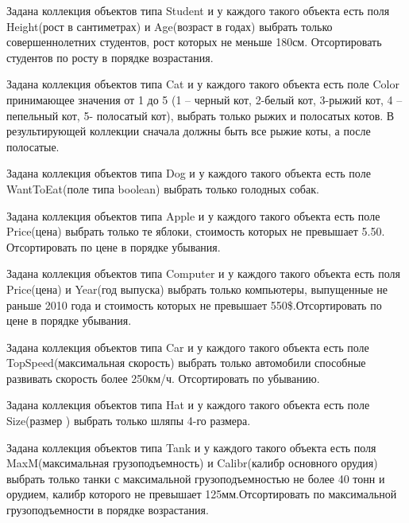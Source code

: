 \task Задана коллекция объектов типа Student и у каждого такого объекта
есть поля Height(рост в сантиметрах) и Age(возраст в годах) выбрать
только совершеннолетних студентов, рост которых не меньше
180см. Отсортировать студентов по росту в порядке возрастания.

\task Задана коллекция объектов типа Cat и у каждого такого объекта есть
поле Color принимающее значения от 1 до 5 (1 – черный кот, 2-белый
кот, 3-рыжий кот, 4 – пепельный кот, 5- полосатый кот), выбрать только
рыжих и полосатых котов. В результирующей коллекции сначала должны
быть все рыжие коты, а после полосатые.

\task Задана коллекция объектов типа Dog и у каждого такого объекта есть
поле WantToEat(поле типа boolean) выбрать только голодных собак.

\task Задана коллекция объектов типа Apple и у каждого такого объекта
есть поле Price(цена) выбрать только те яблоки, стоимость которых не
превышает 5.50. Отсортировать по цене в порядке убывания.

\task Задана коллекция объектов типа Computer и у каждого такого объекта
есть поля Price(цена) и Year(год выпуска) выбрать только компьютеры,
выпущенные не раньше 2010 года и стоимость которых не превышает
550\$.Отсортировать по цене в порядке убывания.

\task Задана коллекция объектов типа Car и у каждого такого объекта есть
поле TopSpeed(максимальная скорость) выбрать только автомобили
способные развивать скорость более 250км/ч. Отсортировать по убыванию.

\task Задана коллекция объектов типа Hat и у каждого такого объекта есть
поле Size(размер ) выбрать только шляпы 4-го размера.

\task Задана коллекция объектов типа Tank и у каждого такого объекта
есть поля MaxM(максимальная грузоподъемность) и Calibr(калибр
основного орудия) выбрать только танки с максимальной
грузоподъемностью не более 40 тонн и орудием, калибр которого не
превышает 125мм.Отсортировать по максимальной грузоподъемности в
порядке возрастания.
